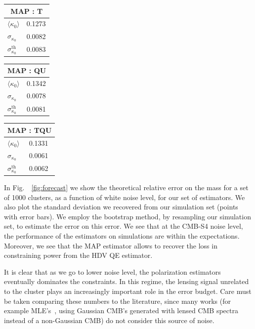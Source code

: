 \documentclass[prd, superscriptaddress, tightenlines, longbibliography, nofootinbib, eqsecnum, amsfonts, amsmath, floatfix, twocolumn, notitlepage]{revtex4-2}
\begin{document}
\begin{table}[]
\begin{tabularx}{0.15\textwidth}{|X|X|}
    \hline
    \multicolumn{2}{|c|}{MAP : T} \\ \hline
    $\langle\kappa_0 \rangle$      & 0.1273   \\ \hline
    $\sigma_{\kappa_0}$ & 0.0082  \\\hline
    $\sigma_{\kappa_0}^{\text{th}}$ & 0.0083  \\\hline
    \end{tabularx}
    \begin{tabularx}{0.15\textwidth}{|X|X|}
    \hline
    \multicolumn{2}{|c|}{MAP : QU} \\ \hline
    $\langle\kappa_0 \rangle$      & 0.1342   \\ \hline
    $\sigma_{\kappa_0}$ & 0.0078  \\\hline
    $\sigma_{\kappa_0}^{\text{th}}$ & 0.0081  \\\hline
    \end{tabularx}
    \begin{tabularx}{0.15\textwidth}{|X|X|}
    \hline
    \multicolumn{2}{|c|}{MAP : TQU} \\ \hline
    $\langle\kappa_0 \rangle$      & 0.1331   \\ \hline
    $\sigma_{\kappa_0}$ & 0.0061  \\\hline
    $\sigma_{\kappa_0}^{\text{th}}$ & 0.0062  \\\hline
    \end{tabularx}
    \label{tab:results}
\end{table}
In Fig.~~\ref{fig:forecast} we show the theoretical relative error on the mass for a set of 1000 clusters, as a function of white noise level, for our set of estimators. We also plot the standard deviation we recovered from our simulation set (points with error bars). We employ the bootstrap method, by resampling our simulation set, to estimate the error on this error. 
We see that at the CMB-S4 noise level, the performance of the estimators on simulations are within the expectations. Moreover, we see that the MAP estimator allows to recover the loss in constraining power from the HDV QE estimator.

It is clear that as we go to lower noise level, the polarization estimators eventually dominates the constraints. In this regime, the lensing signal unrelated to the cluster plays an increasingly important role in the error budget. Care must be taken comparing these numbers to the literature, since many works (for example MLE's~\cite{Raghunathan:2017cle}, using Gaussian CMB's generated with lensed CMB spectra instead of a non-Gaussian CMB) do not consider this source of noise.
\end{document}
